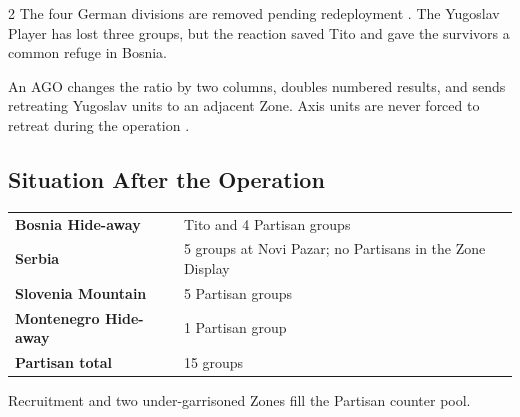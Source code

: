 \begin{multicols}{2}
The four German divisions are removed pending redeployment
. The Yugoslav Player has lost three groups, but the reaction
saved Tito and gave the survivors a common refuge in Bosnia.

\begin{commentarybox}
An AGO changes the ratio by two columns, doubles numbered results, and sends
retreating Yugoslav units to an adjacent Zone. Axis units are never forced to
retreat during the operation .
\end{commentarybox}

\subsection{Situation After the Operation}

\begin{tabularx}{\linewidth}{@{}>{\bfseries}l X@{}}
  Bosnia Hide-away & Tito and 4 Partisan groups \\
  Serbia & 5 groups at Novi Pazar; no Partisans in the Zone Display \\
  Slovenia Mountain & 5 Partisan groups \\
  Montenegro Hide-away & 1 Partisan group \\
  Partisan total & 15 groups \\
\end{tabularx}
\end{multicols}

\playbookbreak
{}
  {Recruitment and two under-garrisoned Zones fill the Partisan counter pool.}

